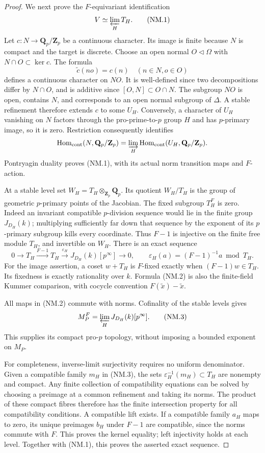 \documentclass[11pt,a4paper]{article}
\newcommand{\Z}{\mathbf Z}
\newcommand{\Q}{\mathbf Q}
\newcommand{\Hom}{\operatorname{Hom}}
\begin{document}
\begin{proof}
We next prove the $F$-equivariant identification
\[
                    V\simeq\varprojlim_H T_H.                 \tag{NM.1}
\]
Let $c:N\to\Q_p/\Z_p$ be a continuous character. Its image is
finite because $N$ is compact and the target is discrete. Choose
an open normal $O\triangleleft\Omega$ with
$N\cap O\subset\ker c$. The formula
\[
                  \widetilde c(no)=c(n)\quad(n\in N,o\in O)
\]
defines a continuous character on $NO$. It is well-defined since
two decompositions differ by $N\cap O$, and is additive since
$[O,N]\subset O\cap N$. The subgroup $NO$ is open, contains $N$,
and corresponds to an open normal subgroup of $\Delta$. A stable
refinement therefore extends $c$ to some $U_H$. Conversely, a
character of $U_H$ vanishing on $N$ factors through the
pro-prime-to-$p$ group $H$ and has $p$-primary image, so it is
zero. Restriction consequently identifies
\[
 \Hom_{\mathrm{cont}}(N,\Q_p/\Z_p)
 =\varinjlim_H\Hom_{\mathrm{cont}}(U_H,\Q_p/\Z_p).
\]
Pontryagin duality proves (NM.1), with its actual norm transition
maps and $F$-action.

At a stable level set $W_H=T_H\otimes_{\Z_p}\Q_p$. Its quotient
$W_H/T_H$ is the group of geometric $p$-primary points of the
Jacobian. The fixed subgroup $T_H^F$ is zero. Indeed an invariant
compatible $p$-division sequence would lie in the finite group
$J_{D_H}(k)$; multiplying sufficiently far down that sequence by
the exponent of its $p$-primary subgroup kills every coordinate.
Thus $F-1$ is injective on the finite free module $T_H$, and
invertible on $W_H$. There is an exact sequence
\[
 0\longrightarrow T_H\xrightarrow{F-1}T_H
 \xrightarrow{\varepsilon_H} J_{D_H}(k)[p^\infty]
 \longrightarrow0,\qquad
 \varepsilon_H(a)=(F-1)^{-1}a\bmod T_H.                       \tag{NM.2}
\]
For the image assertion, a coset $w+T_H$ is $F$-fixed exactly
when $(F-1)w\in T_H$. Its fixedness is exactly rationality over
$k$. Formula (NM.2) is also the finite-field Kummer comparison,
with cocycle convention $F(\widetilde x)-\widetilde x$.

All maps in (NM.2) commute with norms. Cofinality of the stable
levels gives
\[
 M_P^F=\varprojlim_H J_{D_H}(k)[p^\infty].                    \tag{NM.3}
\]
This supplies its compact pro-$p$ topology, without imposing a
bounded exponent on $M_P$.

For completeness, inverse-limit surjectivity requires no uniform
denominator. Given a compatible family $m_H$ in (NM.3), the sets
$\varepsilon_H^{-1}(m_H)\subset T_H$ are nonempty and compact.
Any finite collection of compatibility equations can be solved by
choosing a preimage at a common refinement and taking its norms.
The product of these compact fibres therefore has the finite
intersection property for all compatibility conditions. A compatible
lift exists. If a compatible family $a_H$ maps to zero, its unique
preimages $b_H$ under $F-1$ are compatible, since the norms commute
with $F$. This proves the kernel equality; left injectivity holds
at each level. Together with (NM.1), this proves the asserted
exact sequence.


\end{proof}
\end{document}

